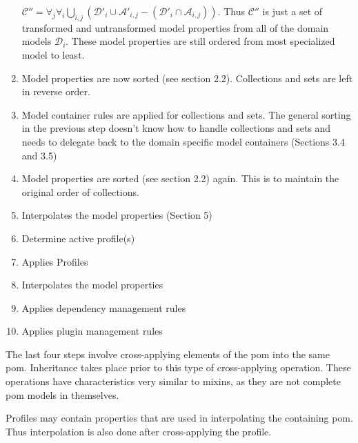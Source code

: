 \documentclass[12pt]{amsart}
\begin{document}
\begin{enumerate}
\begin{math}
\mathcal{C''} =  \forall_j \forall_i \bigcup_{i,j}(\mathcal{D'}_{i} \cup \mathcal{A'}_{i,j} - (\mathcal{D'}_{i} \cap\mathcal{A}_{i,j})) \end{math}. Thus \begin{math}\mathcal{C''} \end{math} is just a set of transformed and untransformed model properties from all of the domain models \begin{math}
\mathcal{D}_{i} \end{math}. These model properties are still ordered from most specialized model to least.
\item Model properties are now sorted (see section 2.2). Collections and sets are left in reverse order.
\item Model container rules are applied for collections and sets. The general sorting in the previous step doesn't know how to handle collections and sets and needs to delegate back to the domain specific model containers (Sections 3.4 and 3.5)
\item Model properties are sorted (see section 2.2) again. This is to maintain the original order of collections.
\item Interpolates the model properties (Section 5)
\item Determine active profile(s)
\item Applies Profiles
\item Interpolates the model properties
\item Applies dependency management rules
\item Applies plugin management rules
\end{enumerate}

The last four steps involve cross-applying elements of the pom into the same pom. Inheritance takes place prior to this type of cross-applying operation. These operations have characteristics very similar to mixins, as they are not complete pom models in themselves.

Profiles may contain properties that are used in interpolating the containing pom. Thus interpolation is also done after cross-applying the profile.
\end{document}
